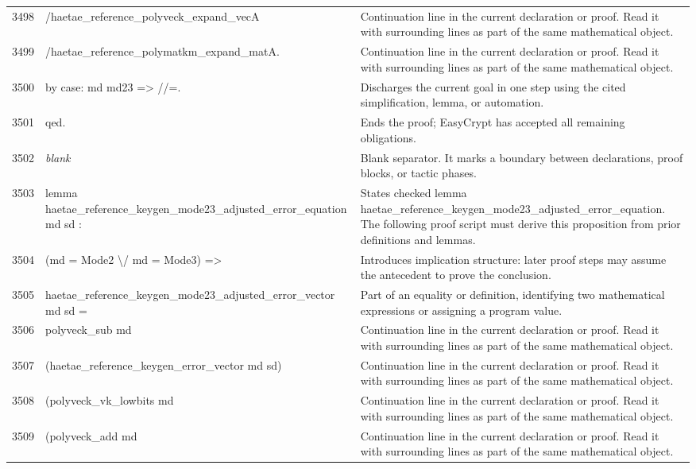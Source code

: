 \documentclass[10pt]{article}
\begin{document}
\begin{longtable}{r L{0.53\textwidth} L{0.37\textwidth}}
3498 & {\ttfamily\scriptsize         /haetae\_reference\_polyveck\_expand\_vecA} & Continuation line in the current declaration or proof.  Read it with surrounding lines as part of the same mathematical object. \\
3499 & {\ttfamily\scriptsize         /haetae\_reference\_polymatkm\_expand\_matA.} & Continuation line in the current declaration or proof.  Read it with surrounding lines as part of the same mathematical object. \\
3500 & {\ttfamily\scriptsize by case: md md23 => //=.} & Discharges the current goal in one step using the cited simplification, lemma, or automation. \\
3501 & {\ttfamily\scriptsize qed.} & Ends the proof; EasyCrypt has accepted all remaining obligations. \\
3502 & {\ttfamily\scriptsize \emph{blank}} & Blank separator.  It marks a boundary between declarations, proof blocks, or tactic phases. \\
3503 & {\ttfamily\scriptsize lemma haetae\_reference\_keygen\_mode23\_adjusted\_error\_equation md sd :} & States checked lemma haetae\_reference\_keygen\_mode23\_adjusted\_error\_equation.  The following proof script must derive this proposition from prior definitions and lemmas. \\
3504 & {\ttfamily\scriptsize   (md = Mode2 \textbackslash{}/ md = Mode3) =>} & Introduces implication structure: later proof steps may assume the antecedent to prove the conclusion. \\
3505 & {\ttfamily\scriptsize   haetae\_reference\_keygen\_mode23\_adjusted\_error\_vector md sd =} & Part of an equality or definition, identifying two mathematical expressions or assigning a program value. \\
3506 & {\ttfamily\scriptsize   polyveck\_sub md} & Continuation line in the current declaration or proof.  Read it with surrounding lines as part of the same mathematical object. \\
3507 & {\ttfamily\scriptsize     (haetae\_reference\_keygen\_error\_vector md sd)} & Continuation line in the current declaration or proof.  Read it with surrounding lines as part of the same mathematical object. \\
3508 & {\ttfamily\scriptsize     (polyveck\_vk\_lowbits md} & Continuation line in the current declaration or proof.  Read it with surrounding lines as part of the same mathematical object. \\
3509 & {\ttfamily\scriptsize       (polyveck\_add md} & Continuation line in the current declaration or proof.  Read it with surrounding lines as part of the same mathematical object. \\

\end{longtable}
\end{document}
